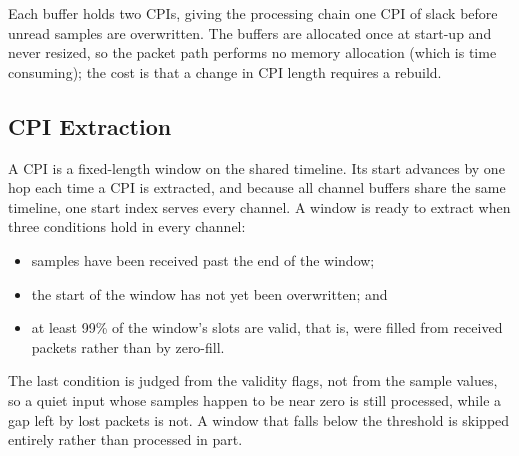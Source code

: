 Each buffer holds two CPIs, giving the processing chain one CPI of slack before unread samples are overwritten. The buffers are allocated once at start-up and never resized, so the packet path performs no memory allocation (which is time consuming); the cost is that a change in CPI length requires a rebuild.

\begin{figure}[H]
    \centering
    \caption[TODO]{}
    \label{fig:ch4.buffer}
\end{figure}


\subsection{CPI Extraction}
\label{subsec:ch4.ingest.cpi}

A CPI is a fixed-length window on the shared timeline. Its start advances by one hop each time a CPI is extracted, and because all channel buffers share the same timeline, one start index serves every channel. A window is ready to extract when three conditions hold in every channel:
\begin{itemize}
    \item samples have been received past the end of the window;
    \item the start of the window has not yet been overwritten; and
    \item at least 99\% of the window's slots are valid, that is, were filled from received packets rather than by zero-fill.
\end{itemize}
The last condition is judged from the validity flags, not from the sample values, so a quiet input whose samples happen to be near zero is still processed, while a gap left by lost packets is not. A window that falls below the threshold is skipped entirely rather than processed in part.

